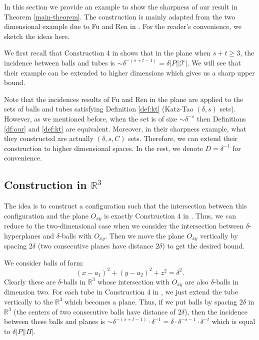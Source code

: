 \documentclass[11pt]{article}
\newcommand{\1}{\mathbf{1}}
\begin{document}
In this section we provide an example to show the sharpness of our result in Theorem \ref{main-theorem}. The construction is mainly adapted from the two dimensional example due to Fu and Ren in \cite{FuRen}. For the reader's convenience, we sketch the ideas here. 

We first recall that Construction 4 in \cite{FuRen} shows that in the plane when $s + t \geq 3$, the incidence between balls and tubes is $\sim \delta^{-(s +t -1)} =\delta |P||\mathcal{T}|$. We will see that their example can be extended to higher dimensions which gives us a sharp upper bound. 

Note that the incidences results of Fu and Ren \cite{FuRen} in the plane are applied to the sets of balls and tubes satisfying Definition \ref{def:kt} (Katz-Tao $(\delta, s)$ sets). However, as we mentioned before, when the set is of size $ \sim \delta^{-s}$ then Definitions \ref{df:our} and \ref{def:kt} are equivalent. Moreover, in their sharpness example, what they constructed are actually $(\delta, s, C)$ sets. Therefore, we can extend their construction to higher dimensional spaces.  In the rest, we  denote $D=\delta^{-1}$ for convenience.

\subsection{Construction in $\mathbb{R}^3$}

The idea is to construct a configuration such that the intersection between this configuration and the plane $O_{xy}$ is exactly Construction 4 in \cite{FuRen}. Thus, we can reduce to the two-dimensional case when we consider the intersection between $\delta$-hyperplanes and $\delta$-balls with $O_{xy}$.  Then we move the plane $O_{xy}$ vertically by spacing $2\delta$ (two consecutive planes have distance $2\delta$) to get the desired bound. 

We consider balls of form: 
\[ (x-a_1)^2 +(y-a_2)^2+z^2=\delta^2.\]
Clearly these are $\delta$-balls in $\mathbb{R}^3$ whose intersection with $O_{xy}$ are also $\delta$-balls in dimension two. For each tube in Construction 4 in \cite{FuRen}, we just extend the tube vertically to the $\mathbb{R}^3$ which becomes a plane. Thus, if we put balls by spacing $2\delta$ in $\mathbb{R}^3$ (the centers of two consecutive balls have distance of $2\delta$), then the incidence between these balls and planes is $ \sim \delta^{-(s+t -1)} \cdot \delta^{-1} = \delta \cdot \delta^{-s-1} \cdot \delta^{-t}$ which is equal to $\delta |P||\Pi|$.
\end{document}

